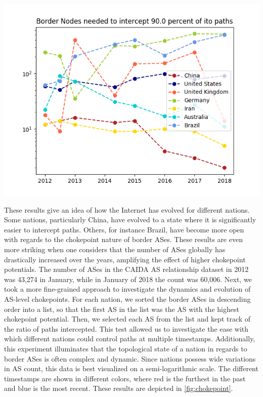 \documentclass{article}
\newenvironment{Figure}
  {\par\medskip\noindent\minipage{\linewidth}}
  {\endminipage\par\medskip}
\begin{document}
\begin{multicols}{2}
\begin{Figure}
	\centering
	\includegraphics[width=\linewidth]{NodesNeeded}
	\label{fig:NumToIntercept}
\end{Figure}

\par
These results give an idea of how the Internet has evolved for different nations. Some nations,
particularly China, have evolved to a state where it is significantly easier
to intercept paths. Others, for instance Brazil, have become more open with
regards to the chokepoint nature of border ASes. These results are even more
striking when one considers that the number of ASes globally has drastically
increased over the years, amplifying the effect of higher chokepoint
potentials. The number of ASes in the CAIDA AS relationship dataset in 2012
was 43,274 in January, while in January of 2018 the count was 60,006.
Next, we took a more fine-grained approach to investigate the dynamics and
evolution of AS-level chokepoints. For each nation, we sorted the border ASes
in descending order into a list, so that the first AS in the list was the AS
with the highest chokepoint potential. Then, we selected each AS from the list
and kept track of the ratio of paths intercepted. This test allowed us to
investigate the ease with which different nations could control paths at
multiple timestamps. Additionally, this experiment illuminates that the
topological state of a nation in regards to border ASes is often complex and
dynamic. Since nations possess wide variations in AS count, this data is best
visualized on a semi-logarithmic scale. The different timestamps are shown in
different colors, where red is the furthest in the past and blue is the most
recent. These results are depicted in \ref{fig:chokepoint}. 


\end{multicols}
\end{document}
